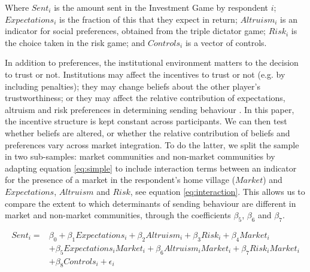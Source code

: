 Where $Sent_i$ is the amount sent in the Investment Game by respondent $i$; $Expectations_i$ is the fraction of this that they expect in return;  $Altruism_i$ is an indicator for social preferences, obtained from the triple dictator game; $Risk_i$ is the choice taken in the risk game; and $Controls_i$ is a vector of controls.

In addition to preferences, the institutional environment matters to the decision to trust or not. Institutions may affect the incentives to trust or not (e.g. by including penalties); they may change beliefs about the other player's trustworthiness; or they may affect the relative contribution of expectations, altruism and risk preferences in determining sending behaviour \citep{Bohnet2007}. In this paper, the incentive structure is kept constant across participants. We can then test whether beliefs are altered, or whether the relative contribution of beliefs and preferences vary across market integration. To do the latter, we split the sample in two sub-samples: market communities and non-market communities by adapting equation \ref{eq:simple} to include interaction terms between an indicator for the presence of a market in the respondent's home village ($Market$) and $Expectations$, $Altruism$ and $Risk$, see equation \ref{eq:interaction}. This allows us to compare the extent to which determinants of sending behaviour are different in market and non-market communities, through the coefficients $\beta_5$, $\beta_6$ and $\beta_7$.

\begin{equation}
\begin{split}
\label{eq:interaction}
Sent_i = & \beta_0 + \beta_1 Expectations_i + \beta_2 Altruism_i + \beta_3 Risk_i + \beta_4 Market_i \\
&+  \beta_5 Expectations_i Market_i +  \beta_6 Altruism_i Market_i   + \beta_7 Risk_i Market_i \\
& + \beta_8 Controls_i + \epsilon_i 
\end{split}
\end{equation} 


